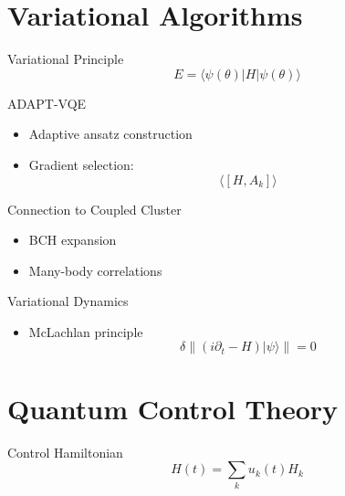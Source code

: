 \documentclass{beamer}
\begin{document}
\section{Variational Algorithms}

\begin{frame}{Variational Principle}
\[
E = \langle \psi(\theta)|H|\psi(\theta)\rangle
\]
\end{frame}


\begin{frame}{ADAPT-VQE}
\begin{itemize}
\item Adaptive ansatz construction
\item Gradient selection:
\[
\langle [H,A_k] \rangle
\]
\end{itemize}
\end{frame}


\begin{frame}{Connection to Coupled Cluster}
\begin{itemize}
\item BCH expansion
\item Many-body correlations
\end{itemize}
\end{frame}


\begin{frame}{Variational Dynamics}
\begin{itemize}
\item McLachlan principle
\[
\delta \| (i\partial_t - H)|\psi\rangle \| = 0
\]
\end{itemize}
\end{frame}

\section{Quantum Control Theory}

\begin{frame}{Control Hamiltonian}
\[
H(t) = \sum_k u_k(t) H_k
\]
\end{frame}
\end{document}
